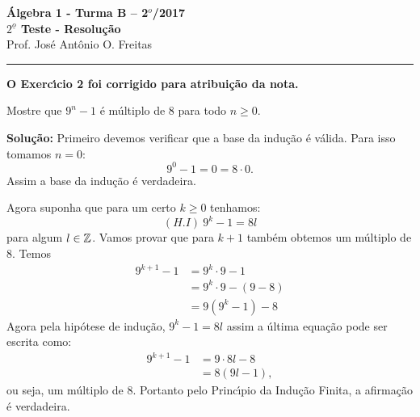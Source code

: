 \documentclass[12pt]{article}
\begin{document}


\begin{center}
{\Large\bf {\'A}lgebra 1 - Turma B -- 2$^{o}$/2017} \\ \vspace{9pt} {\large\bf
  $2^{\underline{o}}$ Teste - Resolu\c{c}\~ao}\\
\vspace{9pt} Prof. Jos{\'e} Ant{\^o}nio O. Freitas
\end{center}
\hrule

\vspace{.6cm}


\vspace{.6cm}

\textbf{O Exerc{\'\i}cio 2 foi corrigido para atribui\c{c}\~ao da nota.}

\vspace{.6cm}

\questao Mostre que $9^n - 1$ {\'e} m\'ultiplo de 8 para todo $n \ge 0$.

\noindent\textbf{Solu\c{c}\~ao:} Primeiro devemos verificar que a base da indu\c{c}\~ao \'e v\'alida. Para isso tomamos $n = 0$:
\[
	9^0 - 1 = 0 = 8\cdot 0.
\]
Assim a base da indu\c{c}\~ao \'e verdadeira.

Agora suponha que para um certo $k \ge 0$ tenhamos:
\[
	(H.I)\ 9^k - 1 = 8l
\]
para algum $l \in \mathbb{Z}$. Vamos provar que para $k + 1$ tamb\'em obtemos um m\'ultiplo de 8. Temos
\begin{align*}
	9^{k + 1} - 1 &= 9^k\cdot 9 - 1 \\& = 9^k\cdot 9 - (9 - 8) \\ &= 9(9^k - 1) - 8
\end{align*}
Agora pela hip\'otese de indu\c{c}\~ao, $9^k - 1 = 8l$ assim a \'ultima equa\c{c}\~ao pode ser escrita como:
\begin{align*}
	9^{k + 1} - 1 &= 9\cdot 8l - 8 \\ &= 8(9l - 1),
\end{align*}
ou seja, um m\'ultiplo de 8. Portanto pelo Princ{\'\i}pio da Indu\c{c}\~ao Finita, a afirma\c{c}\~ao \'e verdadeira.

\vspace{.5cm}
\end{document}
